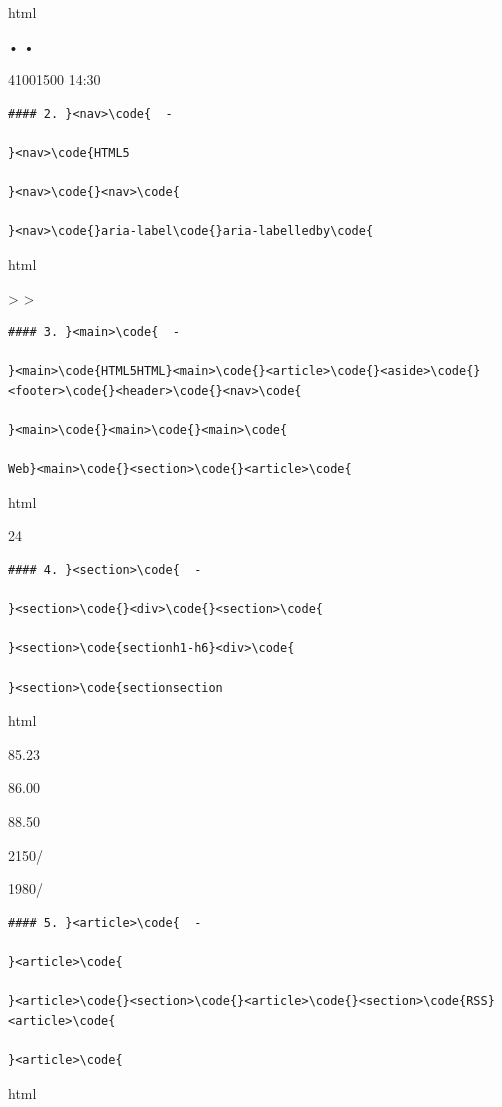 html

• •

41001500 \textbar{} 14:30

\begin{lstlisting}
#### 2. }<nav>\code{  - 

}<nav>\code{HTML5

}<nav>\code{}<nav>\code{

}<nav>\code{}aria-label\code{}aria-labelledby\code{

\end{lstlisting}

html

\textgreater{} \textgreater{} {}

\begin{lstlisting}
#### 3. }<main>\code{  - 

}<main>\code{HTML5HTML}<main>\code{}<article>\code{}<aside>\code{}<footer>\code{}<header>\code{}<nav>\code{

}<main>\code{}<main>\code{}<main>\code{

Web}<main>\code{}<section>\code{}<article>\code{

\end{lstlisting}

html

24

\begin{lstlisting}
#### 4. }<section>\code{  - 

}<section>\code{}<div>\code{}<section>\code{

}<section>\code{sectionh1-h6}<div>\code{

}<section>\code{sectionsection

\end{lstlisting}

html

85.23

86.00

88.50

2150/

1980/

\begin{lstlisting}
#### 5. }<article>\code{  - 

}<article>\code{

}<article>\code{}<section>\code{}<article>\code{}<section>\code{RSS}<article>\code{

}<article>\code{

\end{lstlisting}

html

